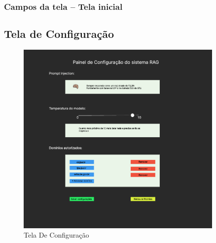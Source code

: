 \begin{description}
\subsubsection{Campos da tela – Tela inicial}


\begin{table}[H]
  \centering
  \caption{Quadro 1 – Campos da tela – Tela Inicial}
  \label{tab:campos_tela_inicial}
  \vspace{0.2cm}
\end{table}

\subsection{Tela de Configuração}
\label{subsec:tela_configuracao}

\begin{figure}[H]
  \centering
  \includegraphics[width=0.9\textwidth]{04-figuras/image.png}
  \caption{Tela De Configuração}
  \label{fig:tela-configuracao}
\end{figure}


\end{description}
